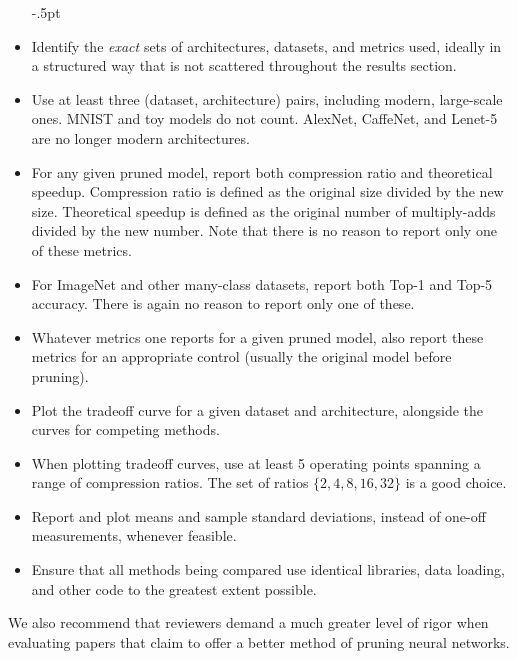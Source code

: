 \begin{itemize}[leftmargin=4mm]
    \itemsep-.5pt
    \vspace{-2mm}
\item Identify the \textit{exact} sets of architectures, datasets, and metrics used, ideally in a structured way that is not scattered throughout the results section. %
\item Use at least three (dataset, architecture) pairs, including modern, large-scale ones. MNIST and toy models do not count. AlexNet, CaffeNet, and Lenet-5 are no longer modern architectures.
\item For any given pruned model, report both compression ratio and theoretical speedup. Compression ratio is defined as the original size divided by the new size. Theoretical speedup is defined as the original number of multiply-adds divided by the new number. Note that there is no reason to report only one of these metrics.%
\item For ImageNet and other many-class datasets, report both Top-1 and Top-5 accuracy. There is again no reason to report only one of these.
\item Whatever metrics one reports for a given pruned model, also report these metrics for an appropriate control (usually the original model before pruning).
\item Plot the tradeoff curve for a given dataset and architecture, alongside the curves for competing methods. %
\item When plotting tradeoff curves, use at least 5 operating points spanning a range of compression ratios. The set of ratios $\{2, 4, 8, 16, 32\}$ is a good choice.
\item Report and plot means and sample standard deviations, instead of one-off measurements, whenever feasible.
\item Ensure that all methods being compared use identical libraries, data loading, and other code to the greatest extent possible.
\vspace{-2mm}
\end{itemize}

We also recommend that reviewers demand a much greater level of rigor when evaluating papers that claim to offer a better method of pruning neural networks.
